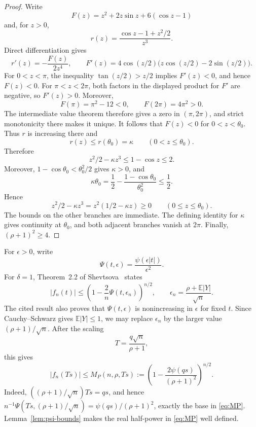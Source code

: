 \documentclass[11pt,a4paper,twoside]{article}
\newcommand{\manualtag}[1]{\tag{#1}}
\theoremstyle{remark}
\newcommand{\E}{\mathbb{E}}
\newcommand{\abs}[1]{\lvert#1\rvert}
\begin{document}
\begin{proof}
Write
\[
 F(z)=z^2+2z\sin z+6(\cos z-1)
\]
and, for \(z>0\),
\[
 r(z)=\frac{\cos z-1+z^2/2}{z^3}.
\]
Direct differentiation gives
\[
 r'(z)=-\frac{F(z)}{2z^4},
 \qquad
 F'(z)=4\cos(z/2)
 \bigl(z\cos(z/2)-2\sin(z/2)\bigr).
\]
For \(0<z<\pi\), the inequality \(\tan(z/2)>z/2\) implies
\(F'(z)<0\), and hence \(F(z)<0\).
For \(\pi<z<2\pi\), both factors in the displayed product for
\(F'\) are negative, so \(F'(z)>0\).  Moreover,
\[
 F(\pi)=\pi^2-12<0,
 \qquad
 F(2\pi)=4\pi^2>0.
\]
The intermediate value theorem therefore gives a zero in \((\pi,2\pi)\),
and strict monotonicity there makes it unique.  It follows that
\(F(z)<0\) for \(0<z<\theta_0\).  Thus \(r\) is increasing there
and
\[
 r(z)\le r(\theta_0)=\kappa
 \qquad(0<z\le\theta_0).
\]
Therefore
\[
 z^2/2-\kappa z^3\le1-\cos z\le2.
\]
Moreover, \(1-\cos\theta_0<\theta_0^2/2\) gives \(\kappa>0\), and
\[
 \kappa\theta_0
 =
 \frac12-\frac{1-\cos\theta_0}{\theta_0^2}
 \le\frac12.
\]
Hence
\[
 z^2/2-\kappa z^3
 =
 z^2(1/2-\kappa z)\ge0
 \qquad(0\le z\le\theta_0).
\]
The bounds on the other branches are immediate.
The defining identity for \(\kappa\) gives continuity at
\(\theta_0\), and both adjacent branches vanish at \(2\pi\).
Finally, \((\rho+1)^2\ge4\).
\end{proof}

For \(\epsilon>0\), write
\[
 \Psi(t,\epsilon)=\frac{\psi(\epsilon\abs t)}{\epsilon^2}.
\]
For \(\delta=1\), Theorem~2.2 of Shevtsova~\cite{Shevtsova2012}
states
\[
 \abs{f_n(t)}
 \le
 \left(1-\frac2n\Psi(t,\epsilon_n)\right)^{n/2},
 \qquad
 \epsilon_n=\frac{\rho+\E\abs Y}{\sqrt n}.
\]
The cited result also proves that \(\Psi(t,\epsilon)\) is nonincreasing
in \(\epsilon\) for fixed \(t\).  Since Cauchy--Schwarz gives
\(\E\abs Y\le1\), we may replace \(\epsilon_n\) by the larger value
\((\rho+1)/\sqrt n\).  After the scaling
\begin{equation}
 T=\frac{q\sqrt n}{\rho+1},
 \manualtag{12}\label{eq:T-scaling}
\end{equation}
this gives
\begin{equation}
 \abs{f_n(Ts)}
 \le
 M_P(n,\rho,Ts)
 :=
 \left(
 1-\frac{2\psi(qs)}{(\rho+1)^2}
 \right)^{n/2}.
 \manualtag{13}\label{eq:MP}
\end{equation}
Indeed, \(((\rho+1)/\sqrt n)Ts=qs\), and hence
\(n^{-1}\Psi(Ts,(\rho+1)/\sqrt n)
=\psi(qs)/(\rho+1)^2\), exactly the base in \eqref{eq:MP}.
Lemma~\ref{lem:psi-bounds} makes the real half-power in
\eqref{eq:MP} well defined.
\end{document}
